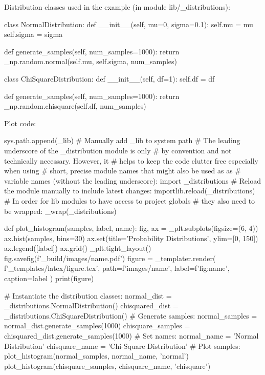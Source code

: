 \documentclass[a4paper]{book}
\begin{document}
Distribution classes used in the example (in module lib/\_distributions):
\begin{python}
class NormalDistribution:
    def __init__(self, mu=0, sigma=0.1):
        self.mu = mu
        self.sigma = sigma
   
    def generate_samples(self, num_samples=1000):
        return _np.random.normal(self.mu, self.sigma, num_samples)

class ChiSquareDistribution:
    def __init__(self, df=1):
        self.df = df

    def generate_samples(self, num_samples=1000):
        return _np.random.chisquare(self.df, num_samples)

\end{python}
Plot code:
\begin{python}
sys.path.append(_lib) # Manually add _lib to system path
# The leading underscore of the _distribution module is only 
# by convention and not technically necessary. However, it 
# helps to keep the code clutter free especially when using 
# short, precise module names that might also be used as as 
# variable names (without the leading underscore):
import _distributions
# Reload the module manually to include latest changes: 
importlib.reload(_distributions)
# In order for lib modules to have access to project globals 
# they also need to be wrapped:
_wrap(_distributions)

def plot_histogram(samples, label, name):
    fig, ax = _plt.subplots(figsize=(6, 4))
    ax.hist(samples, bins=30)
    ax.set(title='Probability Distributions', ylim=[0, 150])
    ax.legend([label])
    ax.grid()
    _plt.tight_layout()
    fig.savefig(f'{_build}/images/{name}.pdf')
    figure = _templater.render(
        f'{_templates}/latex/figure.tex',
        path=f'images/{name}',
        label=f'fig:{name}',
        caption=label
    )
    print(figure)

# Instantiate the distribution classes:
normal_dist         = _distributions.NormalDistribution()
chisquared_dist     = _distributions.ChiSquareDistribution()
# Generate samples:
normal_samples      = normal_dist.generate_samples(1000)
chisquare_samples   = chisquared_dist.generate_samples(1000)
# Set names:
normal_name         = 'Normal Distribution'
chisquare_name      = 'Chi-Square Distribution'
# Plot samples:
plot_histogram(normal_samples, normal_name, 'normal')
plot_histogram(chisquare_samples, chisquare_name, 'chisquare')

\end{python}
\printbibliography
\end{document}
